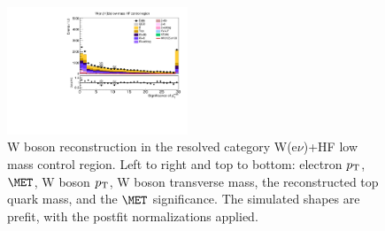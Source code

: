 \begin{figure}[tbp]
\begin{center}
    \includegraphics[width=0.48\textwidth]{figures/wlnhbb2016/resolved/WenWHHeavyFlavorCRLowMass_pfmetsig.pdf}
    \caption{W boson reconstruction in the resolved category W(e$\nu$)+HF low mass control region.
    Left to right and top to bottom: electron $p_{\mathrm{T}}$, $\MET$, W boson $p_{\mathrm{T}}$, W boson transverse mass,
    the reconstructed top quark mass, and the $\MET$ significance.
    The simulated shapes are prefit, with the postfit normalizations applied.}
    \label{fig:res_WenHFLowMass_WBosons}
  \end{center}
\end{figure}
\clearpage

